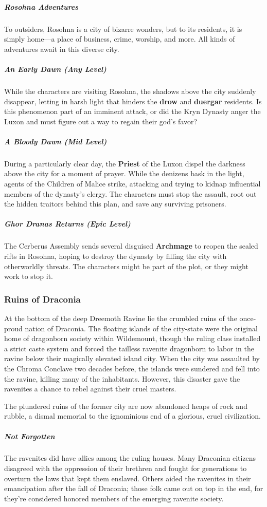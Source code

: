 \documentclass[10pt,a4paper,twoside,bg=print,twocolumn,openany,nodeprecatedcode]{dndbook}
\begin{document}
\subparagraph{Rosohna Adventures}
To outsiders, Rosohna is a city of bizarre wonders, but to its residents, it is simply home—a place of business, crime, worship, and more. All kinds of adventures await in this diverse city.

\subparagraph{An Early Dawn (Any Level)}
While the characters are visiting Rosohna, the shadows above the city suddenly disappear, letting in harsh light that hinders the \textbf{drow} and \textbf{duergar} residents. Is this phenomenon part of an imminent attack, or did the Kryn Dynasty anger the Luxon and must figure out a way to regain their god's favor?

\subparagraph{A Bloody Dawn (Mid Level)}
During a particularly clear day, the \textbf{Priest} of the Luxon dispel the darkness above the city for a moment of prayer. While the denizens bask in the light, agents of the Children of Malice strike, attacking and trying to kidnap influential members of the dynasty's clergy. The characters must stop the assault, root out the hidden traitors behind this plan, and save any surviving prisoners.

\subparagraph{Ghor Dranas Returns (Epic Level)}
The Cerberus Assembly sends several disguised \textbf{Archmage} to reopen the sealed rifts in Rosohna, hoping to destroy the dynasty by filling the city with otherworldly threats. The characters might be part of the plot, or they might work to stop it.

\subsubsection{Ruins of Draconia}
At the bottom of the deep Dreemoth Ravine lie the crumbled ruins of the once-proud nation of Draconia. The floating islands of the city-state were the original home of dragonborn society within Wildemount, though the ruling class installed a strict caste system and forced the tailless ravenite dragonborn to labor in the ravine below their magically elevated island city. When the city was assaulted by the Chroma Conclave two decades before, the islands were sundered and fell into the ravine, killing many of the inhabitants. However, this disaster gave the ravenites a chance to rebel against their cruel masters.

The plundered ruins of the former city are now abandoned heaps of rock and rubble, a dismal memorial to the ignominious end of a glorious, cruel civilization.

\subparagraph{Not Forgotten}
The ravenites did have allies among the ruling houses. Many Draconian citizens disagreed with the oppression of their brethren and fought for generations to overturn the laws that kept them enslaved. Others aided the ravenites in their emancipation after the fall of Draconia; those folk came out on top in the end, for they're considered honored members of the emerging ravenite society.
\end{document}
